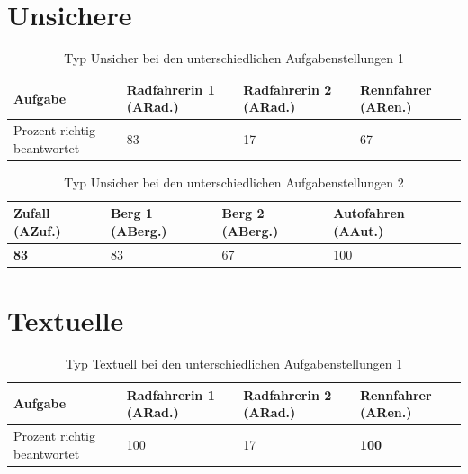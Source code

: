 \section*{Unsichere}
\begin{table}[H]
\hspace{-5pt}
\begin{tabularx}{\textwidth + 5pt}{| @{\hspace{3pt}} M || @{\hspace{3pt}} M  | @{\hspace{3pt}} M | @{\hspace{3pt}} M |}
\hline
\textbf{Aufgabe} & \textbf{Radfahrerin 1 (ARad.)} & \textbf{Radfahrerin 2 (ARad.)} & \textbf{Rennfahrer (ARen.)} \\
\hline
\hline
Prozent richtig beantwortet       & 83 & 17 & 67 \\
\hline
\end{tabularx}
\caption{Typ Unsicher bei den unterschiedlichen Aufgabenstellungen 1}
\end{table}

\begin{table}[H]
\hspace{-5pt}
\begin{tabularx}{\textwidth + 5pt}{| @{\hspace{3pt}} M | @{\hspace{3pt}} M  | @{\hspace{3pt}} M | @{\hspace{3pt}} M |}
\hline
\textbf{Zufall (AZuf.)} & \textbf{Berg 1 (ABerg.)} & \textbf{Berg 2 (ABerg.)} & \textbf{Autofahren (AAut.)}\\
\hline
\hline
    \textbf{83} & 83 & 67 &  100\\
\hline
\end{tabularx}
\caption{Typ Unsicher bei den unterschiedlichen Aufgabenstellungen 2}
\end{table}

\section*{Textuelle}
\begin{table}[H]
\hspace{-5pt}
\begin{tabularx}{\textwidth + 5pt}{| @{\hspace{3pt}} M || @{\hspace{3pt}} M  | @{\hspace{3pt}} M | @{\hspace{3pt}} M |}
\hline
\textbf{Aufgabe} & \textbf{Radfahrerin 1 (ARad.)} & \textbf{Radfahrerin 2 (ARad.)} & \textbf{Rennfahrer (ARen.)} \\
\hline
\hline
Prozent richtig beantwortet       & 100 & 17 & \textbf{100} \\
\hline
\end{tabularx}
\caption{Typ Textuell bei den unterschiedlichen Aufgabenstellungen 1}
\end{table}


